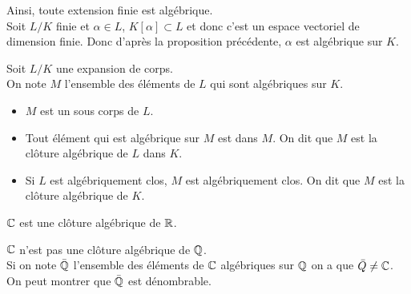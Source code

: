 \begin{remarque}
	Ainsi, toute extension finie est algébrique.\\
	Soit $L/K$ finie et $\alpha \in L$, $K[\alpha] \subset L$ et donc c'est un espace vectoriel de dimension finie. Donc d'après la proposition précédente, $\alpha$ est algébrique sur $K$.
\end{remarque}

\begin{theorem}
	Soit $L/K$ une expansion de corps.\\
	On note $M$ l'ensemble des éléments de $L$ qui sont algébriques sur $K$.
	\begin{itemize}
		\item $M$ est un sous corps de $L$.
		\item Tout élément qui est algébrique sur $M$ est dans $M$. On dit que $M$ est la clôture algébrique de $L$ dans $K$.
		\item Si $L$ est algébriquement clos, $M$ est algébriquement clos. On dit que $M$ est la clôture algébrique de $K$.
	\end{itemize}
\end{theorem}



\begin{example}
	$\mathbb{C}$ est une clôture algébrique de $\mathbb{R}$.
\end{example}

\begin{example}
	$\mathbb{C}$ n'est pas une clôture algébrique de $\mathbb{Q}$. \\
	Si on note $\bar{\mathbb{Q}}$ l'ensemble des éléments de $\mathbb{C}$ algébriques sur $\mathbb{Q}$ on a que $\bar{Q} \neq \mathbb{C}$. On peut montrer que $\bar{\mathbb{Q}}$ est dénombrable.
\end{example}

